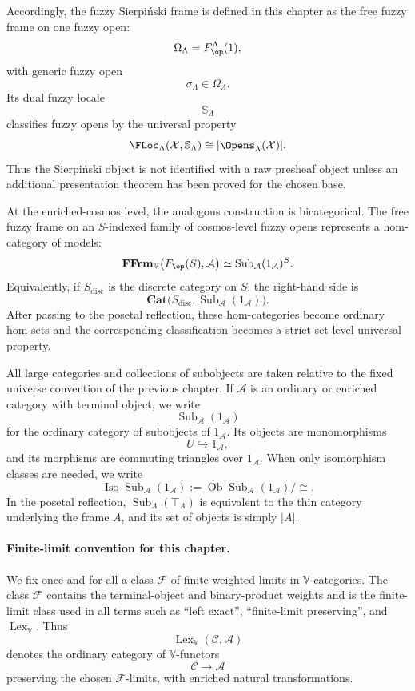 Accordingly, the fuzzy Sierpiński frame is defined in this chapter as the free fuzzy
frame on one fuzzy open:
\[
    \Omega_\Lambda=F_{\op}^{\Lambda}(1),
\]
with generic fuzzy open
\[
    \sigma_\Lambda\in\Omega_\Lambda.
\]
Its dual fuzzy locale
\[
    \mathbb S_\Lambda
\]
classifies fuzzy opens by the universal property
\[
    \FLoc_\Lambda(\mathcal X,\mathbb S_\Lambda)
    \cong
    |\Opens_\Lambda(\mathcal X)|.
\]
Thus the Sierpiński object is not identified with a raw presheaf object unless an
additional presentation theorem has been proved for the chosen base.

At the enriched-cosmos level, the analogous construction is bicategorical. The free
fuzzy frame on an \(S\)-indexed family of cosmos-level fuzzy opens represents a
hom-category of models:
\[
    \mathbf{FFrm}_{\mathbb V}
    \bigl(F_{\op}(S),\mathcal A\bigr)
    \simeq
    \operatorname{Sub}_{\mathcal A}(1_{\mathcal A})^S.
\]
Equivalently, if \(S_{\mathrm{disc}}\) is the discrete category on \(S\), the
right-hand side is
\[
    \mathbf{Cat}
    \bigl(
        S_{\mathrm{disc}},
        \operatorname{Sub}_{\mathcal A}(1_{\mathcal A})
    \bigr).
\]
After passing to the posetal reflection, these hom-categories become ordinary
hom-sets and the corresponding classification becomes a strict set-level universal
property.

All large categories and collections of subobjects are taken relative to the fixed
universe convention of the previous chapter. If \(\mathcal A\) is an ordinary or
enriched category with terminal object, we write
\[
    \operatorname{Sub}_{\mathcal A}(1_{\mathcal A})
\]
for the ordinary category of subobjects of \(1_{\mathcal A}\). Its objects are
monomorphisms
\[
    U\hookrightarrow 1_{\mathcal A},
\]
and its morphisms are commuting triangles over \(1_{\mathcal A}\). When only
isomorphism classes are needed, we write
\[
    \operatorname{Iso}\operatorname{Sub}_{\mathcal A}(1_{\mathcal A})
    :=
    \operatorname{Ob}\operatorname{Sub}_{\mathcal A}(1_{\mathcal A})/{\cong}.
\]
In the posetal reflection, \(\operatorname{Sub}_{A}(\top_A)\) is equivalent to the
thin category underlying the frame \(A\), and its set of objects is simply \(|A|\).

\paragraph{Finite-limit convention for this chapter.}
We fix once and for all a class \(\mathcal F\) of finite weighted limits in
\(\mathbb V\)-categories. The class \(\mathcal F\) contains the terminal-object and
binary-product weights and is the finite-limit class used in all terms such as
``left exact'', ``finite-limit preserving'', and
\(\operatorname{Lex}_{\mathbb V}\). Thus
\[
    \operatorname{Lex}_{\mathbb V}(\mathcal C,\mathcal A)
\]
denotes the ordinary category of \(\mathbb V\)-functors
\[
    \mathcal C\to\mathcal A
\]
preserving the chosen \(\mathcal F\)-limits, with enriched natural transformations.

